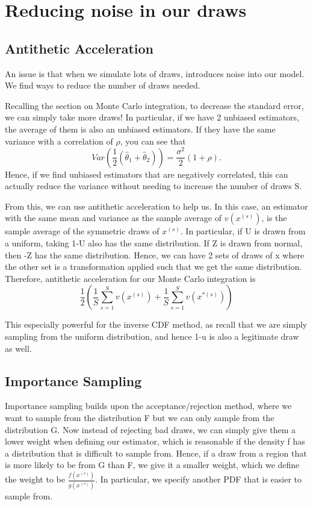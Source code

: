 \documentclass[twoside]{article}
\begin{document}
\section{Reducing noise in our draws}
\subsection{Antithetic Acceleration}

An issue is that when we simulate lots of draws, introduces noise into our model. We find ways to reduce the number of draws needed.

Recalling the section on Monte Carlo integration, to decrease the standard error, we can simply take more draws! In particular, if we have 2 unbiased estimators, the average of them is also an unbiased estimators. If they have the same variance with a correlation of $\rho$, you can see that
$$
Var(\frac{1}{2}(\hat{\theta}_1 + \hat{\theta}_2)) = \frac{\sigma^2}{2}(1 + \rho).
$$
Hence, if we find unbiased estimators that are negatively correlated, this can actually reduce the variance without needing to increase the number of draws S. 


From this, we can use antithetic acceleration to help us. In this case, an estimator with the same mean and variance as the sample average of $v(x^{(s)})$, is the sample average of the symmetric draws of $x^{(s)}$. In particular, if U is drawn from a uniform, taking 1-U also has the same distribution. If Z is drawn from normal, then -Z has the same distribution. Hence, we can have 2 sets of draws of x where the other set is a transformation applied such that we get the same distribution. Therefore, antithetic acceleration for our Monte Carlo integration is
$$
\frac{1}{2}\left(\frac{1}{S}\sum_{s=1}^Sv(x^{(s)}) + \frac{1}{S}\sum_{s=1}^Sv(x^{*(s)})\right)
$$

This especially powerful for the inverse CDF method, as recall that we are simply sampling from the uniform distribution, and hence 1-u is also a legitimate draw as well.

\subsection{Importance Sampling}
Importance sampling builds upon the acceptance/rejection method, where we want to sample from the distribution F but we can only sample from the distribution G. Now instead of rejecting bad draws, we can simply give them a lower weight when defining our estimator, which is reasonable if the density f has a distribution that is difficult to sample from. Hence, if a draw from a region that is more likely to be from G than F, we give it a smaller weight, which we define the weight to be $\frac{f(x^{(s)})}{g(x^{(s)})}$. In particular, we specify another PDF that is easier to sample from.
\end{document}
